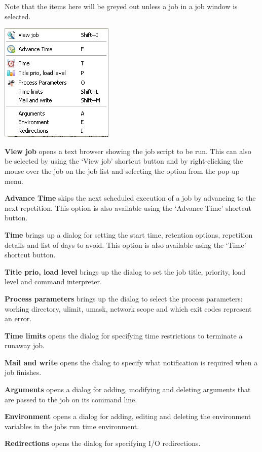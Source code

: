 Note that the items here will be greyed out unless a job in a job window is selected.

\includegraphics{img/btqwjobsmenu.png}

\textbf{View job} opens a text browser showing the job script to be run. This can also be selected by using the `View
job' shortcut button and by right-clicking the mouse over the job on the job list and selecting the option from the pop-up
menu.

\textbf{Advance Time} skips the next scheduled execution of a job by advancing to the next repetition. This option is also available using
the `Advance Time' shortcut button.

\textbf{Time} brings up a dialog for setting the start time, retention options, repetition details and list of days to avoid.
This option is also available using the `Time' shortcut button.

\textbf{Title prio, load level} brings up the dialog to set the job title, priority, load level and command interpreter.

\textbf{Process parameters} brings up the dialog to select the process parameters: working directory, ulimit, umask, network scope and which
exit codes represent an error.

\textbf{Time limits} opens the dialog for specifying time restrictions to terminate a runaway job.

\textbf{Mail and write} opens the dialog to specify what notification is required when a job finishes.

\textbf{Arguments} opens a dialog for adding, modifying and deleting arguments that are passed to the job on its command line.

\textbf{Environment} opens a dialog for adding, editing and deleting the environment variables in the jobs run time environment.

\textbf{Redirections} opens the dialog for specifying I/O redirections.

